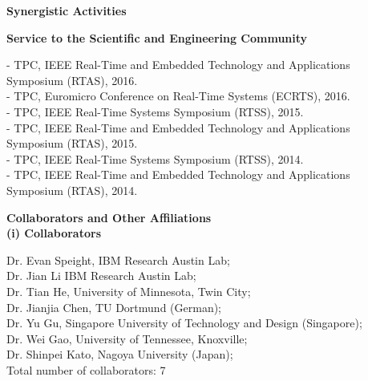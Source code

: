 \documentclass[10pt,letterpaper]{article}
\begin{document}
\noindent \textbf{Synergistic Activities}\
	\begin{changemargin}{4mm}{2mm}
	\textbf{Service to the Scientific and Engineering Community}\
	\vspace{-1mm}
		\begin{changemargin}{2mm}{2mm}	
				-  TPC, IEEE Real-Time and Embedded Technology and Applications Symposium (RTAS), 2016. \\
						-  TPC, Euromicro Conference on Real-Time Systems (ECRTS), 2016. \\
		-   TPC, IEEE Real-Time Systems Symposium (RTSS), 2015. \\
		-  TPC, IEEE Real-Time and Embedded Technology and Applications Symposium (RTAS), 2015. \\
		 -   TPC, IEEE Real-Time Systems Symposium (RTSS), 2014. \\
			- TPC, IEEE Real-Time and Embedded Technology and Applications Symposium (RTAS), 2014.
			
			
		\end{changemargin}
	\end{changemargin}
	
	
\noindent \textbf{Collaborators and Other Affiliations}\\

\vspace{-2mm}
	\hspace{-2mm} \textbf{(i) Collaborators}\  
	\begin{changemargin}{8mm}{2mm}
	\vspace{-2mm}
	Dr. Evan Speight, IBM Research Austin Lab; \\
	Dr. Jian Li IBM Research Austin Lab;\\
	 Dr. Tian He, University of Minnesota, Twin City; \\
	  Dr. Jianjia Chen, TU Dortmund (German);\\
	   Dr. Yu Gu, Singapore University of Technology and Design (Singapore);\\
	    Dr. Wei Gao, University of Tennessee, Knoxville; \\
	    Dr. Shinpei Kato, Nagoya University (Japan);\\
	    Total number of collaborators: 7
	\end{changemargin}
	
\end{document}
